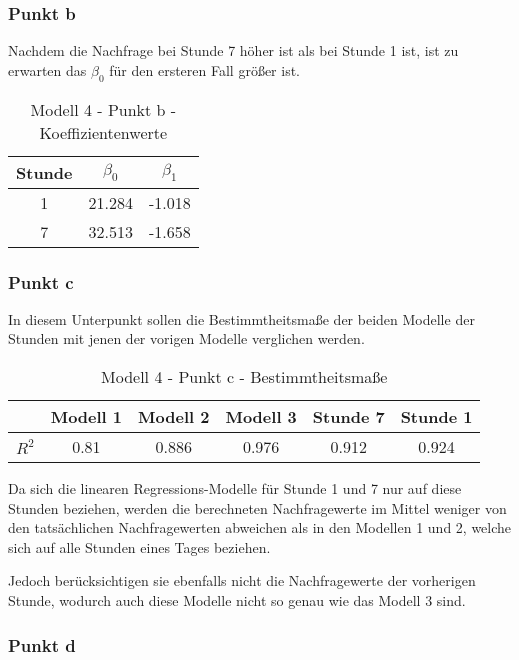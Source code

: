 \documentclass{eegreport}
\begin{document}
\subsubsection{Punkt b}
Nachdem die Nachfrage bei Stunde 7 höher ist als bei Stunde 1 ist, ist zu erwarten das $\beta_0$ für den ersteren Fall größer ist.

\begin{table}[!h]
\begin{center}
\begin{tabular}{|c|c|c|}
\hline 
Stunde  & $\beta_0$ & $\beta_1$ \\ 
\hline 
1 & 21.284 & -1.018 \\ 
\hline 
7 & 32.513 & -1.658 \\ 
\hline 
\end{tabular} 
\end{center}
\caption{Modell 4 - Punkt b - Koeffizientenwerte}
\label{tab4b}
\end{table}

\subsubsection{Punkt c}
In diesem Unterpunkt sollen die Bestimmtheitsmaße der beiden Modelle der Stunden mit jenen der vorigen Modelle verglichen werden.

\begin{table}[!h]
\begin{center}
\begin{tabular}{|c|c|c|c|c|c|}
\hline 
 & Modell 1 & Modell 2 & Modell 3 & Stunde 7 & Stunde 1 \\ 
\hline 
$R^{2}$ & 0.81 & 0.886 & 0.976 & 0.912 & 0.924 \\ 
\hline 
\end{tabular} 
\end{center}
\caption{Modell 4 - Punkt c - Bestimmtheitsmaße}
\label{taba}
\end{table}

Da sich die linearen Regressions-Modelle für Stunde 1 und 7 nur auf diese Stunden beziehen, werden die berechneten Nachfragewerte im Mittel weniger von den tatsächlichen Nachfragewerten abweichen als in den Modellen 1 und 2, welche sich auf alle Stunden eines Tages beziehen. 

Jedoch berücksichtigen sie ebenfalls nicht die Nachfragewerte der vorherigen Stunde, wodurch auch diese Modelle nicht so genau wie das Modell 3 sind.

\newpage
\subsubsection{Punkt d}
\end{document}
